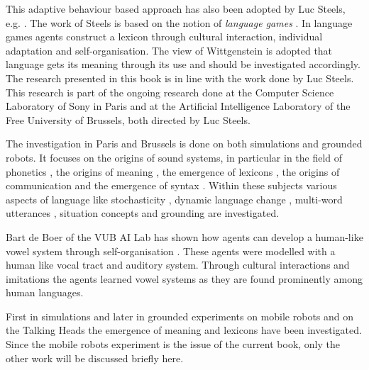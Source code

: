 

This adaptive behaviour based approach has also been adopted by Luc Steels, e.g. \citep{steels:1996a,steels:1996b,steels:1997b}. The work of Steels is based on the notion of {\em language games} \citep{wittgenstein:1958}. In language games agents construct a lexicon through cultural interaction, individual adaptation and self-organisation. The view of Wittgenstein is adopted that language gets its meaning through its use and should be investigated accordingly. The research presented in this book is in line with the work done by Luc Steels. This research is part of the ongoing research done at the Computer Science Laboratory of Sony in Paris and at the Artificial Intelligence Laboratory of the Free University of Brussels, both directed by Luc Steels. 

The investigation in Paris and Brussels is done on both simulations and grounded robots. It focuses on the origins of sound systems, in particular in the field of phonetics \citep{deboer:1997,deboer:1999,oudeyer:1999}, the origins of meaning \citep{steels:1996b,steelsvogt:1997,dejongvogt:1998,vogt:1998a,dejong:1999}, the emergence of lexicons \citep{steels:1996a,steelskaplan:1998,kaplan:2000,vogt:1998b,vanlooveren:1999}, the origins of communication \citep{dejong:1999c,dejong:2000} and the emergence of syntax \citep{steels:2000a}. Within these subjects various aspects of language like stochasticity \citep{steelskaplan:1998,kaplan:2000}, dynamic language change \citep{steels:1997c,steelsmcintyre:1999,deboervogt:1999}, multi-word utterances \citep{vanlooveren:1999}, situation concepts \citep{dejong:99b} and grounding \citep{belpaeme:1998,steelsvogt:1997,steels:2000,kaplan:2000} are investigated.


Bart de Boer of the VUB AI Lab has shown how agents can develop a human-like vowel system through self-organisation \citep{deboer:1997,deboer:1999}. These agents were modelled with a human like vocal tract and auditory system. Through cultural interactions and imitations the agents learned vowel systems as they are found prominently among human languages. 


First in simulations \citep{steels:1996a,steels:1996b} and later in grounded experiments on mobile robots \citep{steelsvogt:1997,vogt:1998a,vogt:1998b,dejongvogt:1998} and on the Talking Heads \citep{belpaeme:1998,kaplan:2000,steels:2000} the emergence of meaning and lexicons have been investigated. Since the mobile robots experiment is the issue of the current book, only the other work will be discussed briefly here. 


